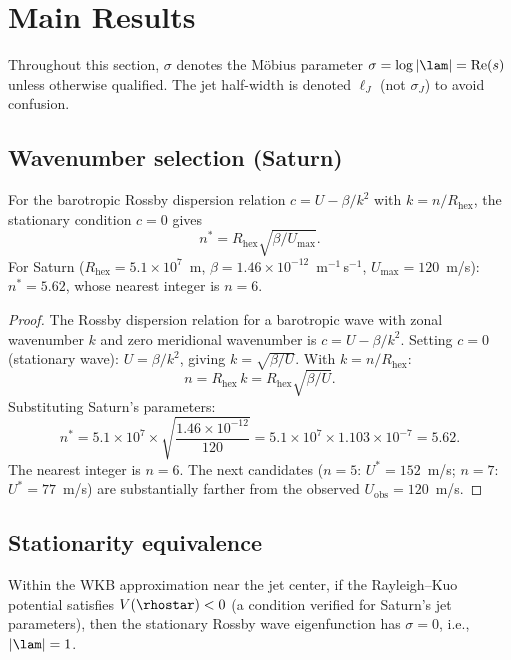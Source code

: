 \section{Main Results}
\label{sec:theorems}

Throughout this section, $\sigma$ denotes the M\"obius parameter
$\sigma = \log|\lam| = \mathrm{Re}(s)$ unless otherwise qualified.  The
jet half-width is denoted $\ell_J$ (not $\sigma_J$) to avoid confusion.

\subsection{Wavenumber selection (Saturn)}

\begin{proposition}\label{prop:wavenumber}
For the barotropic Rossby dispersion relation $c = U - \beta/k^2$ with
$k = n/R_{\mathrm{hex}}$, the stationary condition $c = 0$ gives
\begin{equation}\label{eq:nstar}
  n^* = R_{\mathrm{hex}}\sqrt{\beta / U_{\max}}.
\end{equation}
For Saturn ($R_{\mathrm{hex}} = 5.1 \times 10^7$~m,
$\beta = 1.46 \times 10^{-12}$~m$^{-1}$\,s$^{-1}$,
$U_{\max} = 120$~m/s): $n^* = 5.62$, whose nearest integer is $n = 6$.
\end{proposition}

\begin{proof}
The Rossby dispersion relation for a barotropic wave with zonal
wavenumber $k$ and zero meridional wavenumber is $c = U - \beta/k^2$.
Setting $c = 0$ (stationary wave): $U = \beta/k^2$, giving
$k = \sqrt{\beta/U}$.  With $k = n/R_{\mathrm{hex}}$:
\[
  n = R_{\mathrm{hex}}\,k = R_{\mathrm{hex}}\sqrt{\beta/U}.
\]
Substituting Saturn's parameters:
\[
  n^* = 5.1 \times 10^7 \times \sqrt{\frac{1.46 \times 10^{-12}}{120}}
  = 5.1 \times 10^7 \times 1.103 \times 10^{-7} = 5.62.
\]
The nearest integer is $n = 6$.  The next candidates ($n = 5$: $U^* = 152$~m/s;
$n = 7$: $U^* = 77$~m/s) are substantially farther from the observed
$U_{\mathrm{obs}} = 120$~m/s.
\end{proof}

\subsection{Stationarity equivalence}

\begin{theorem}\label{thm:stationarity}
Within the WKB approximation near the jet center, if the Rayleigh--Kuo
potential satisfies $V(\rhostar) < 0$ (a condition verified for Saturn's
jet parameters), then the stationary Rossby wave eigenfunction has
$\sigma = 0$, i.e., $|\lam| = 1$.
\end{theorem}

